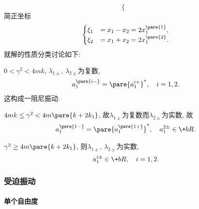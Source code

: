 \documentclass[../LectureNotes.tex]{subfiles}
\begin{document}
\begin{sample}
\begin{ex}
\[\begin{cases}
        \end{cases} \]
        简正坐标
        \[ \begin{cases}
            \xi_1 &= x_1 - x_2 = 2x_1^{\pare{1}}, \\
            \xi_2 &= x_1 + x_2 = 2x_1^{\pare{2}}.
        \end{cases} \]
        就解的性质分类讨论如下:
        \begin{cenum}
            \item $0<\gamma^2<4mk$, $\lambda_{1\pm}$, $\lambda_{2\pm}$为复数,
            \[ a_1^{\pare{i-}} = \pare{a_1^{i+}}^*,\quad i=1,2. \]
            这构成一阻尼振动.
            \item $4mk \le \gamma^2 < 4m\pare{k+2k_1}$, 故$\lambda_{1\pm}$为复数而$\lambda_{2\pm}$为实数, 故
            \[ a_1^{\pare{1-}} = \pare{a_1^{\pare{1+}}}^*,\quad a_1^{2\pm} \in \+bR. \]
            \item $\gamma^2 \ge 4m\pare{k+2k_1}$, 则$\lambda_{1\pm}$, $\lambda_{2\pm}$为实数,
            \[ a_1^{i\pm} \in \+bR,\quad i = 1,2. \]
        \end{cenum}
    \end{ex}
\end{sample}



\subsubsection{受迫振动} %
\label{ssub:受迫振动}

\paragraph{单个自由度} %
\label{par:单个自由度}
\end{document}
